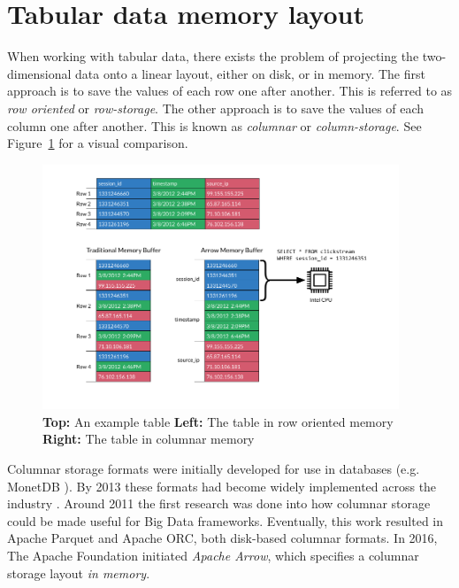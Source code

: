 \section{Tabular data memory layout}
\label{section:column_vs_row}
When working with tabular data, there exists the problem of projecting the two-dimensional data onto a linear layout, either on disk, or in memory.
The first approach is to save the values of each row one after another. This is referred to as \emph{row oriented} or \emph{row-storage}.
The other approach is to save the values of each column one after another. This is known as \emph{columnar} or \emph{column-storage}.
\autocite{Floratou2019}
See Figure~\ref{fig:row_v_col} for a visual comparison.
\begin{figure}
	\begin{center}
		\includegraphics[width=0.95\textwidth]{resources/columnar}
	\end{center}
	\caption{\textbf{Top:} An example table \textbf{Left:} The table in row oriented memory \textbf{Right:} The table in columnar memory \autocite{arrow:overview}}
	\label{fig:row_v_col}
\end{figure}

Columnar storage formats were initially developed for use in databases (e.g. MonetDB \autocite{Boncz2002}).
By 2013 these formats had become widely implemented across the industry
\autocite{Abadi2013}.
Around 2011 the first research was done into how columnar storage could be made useful for Big Data frameworks.
Eventually, this work resulted in Apache Parquet and Apache ORC, both disk-based columnar formats.
\autocite{Floratou2019}
In 2016, The Apache Foundation initiated \emph{Apache Arrow}, which specifies a columnar storage layout \emph{in memory}.
\autocite{Ahmad2020}

